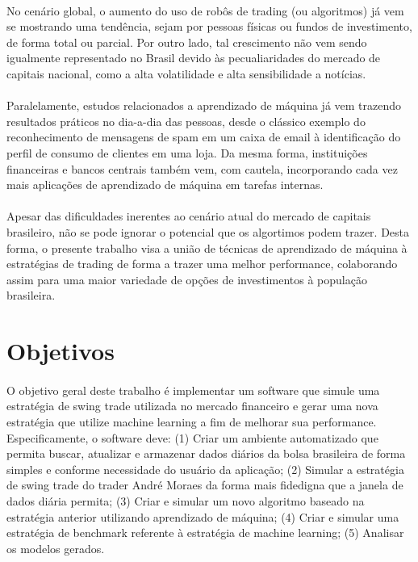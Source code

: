 \paragraph{} No cenário global, o aumento do uso de robôs de trading (ou algoritmos) já vem se mostrando uma tendência\cite{robos_investidores}, sejam por pessoas físicas ou fundos de investimento, de forma total ou parcial. Por outro lado, tal crescimento não vem sendo igualmente representado no Brasil devido às pecualiaridades do mercado de capitais nacional, como a alta volatilidade e alta sensibilidade a notícias\cite{robos_e_fundos}.

\paragraph{} Paralelamente, estudos relacionados a aprendizado de máquina já vem trazendo resultados práticos no dia-a-dia das pessoas, desde o clássico exemplo do reconhecimento de mensagens de spam em um caixa de email à identificação do perfil de consumo de clientes em uma loja. Da mesma forma, instituições financeiras e bancos centrais também vem, com cautela, incorporando cada vez mais aplicações de aprendizado de máquina em tarefas internas\cite{ml_finantial_usage}.

\paragraph{} Apesar das dificuldades inerentes ao cenário atual do mercado de capitais brasileiro, não se pode ignorar o potencial que os algortimos podem trazer. Desta forma, o presente trabalho visa a união de técnicas de aprendizado de máquina à estratégias de trading de forma a trazer uma melhor performance, colaborando assim para uma maior variedade de opções de investimentos à população brasileira.

\section{Objetivos}

\paragraph{} O objetivo geral deste trabalho é implementar um software que simule uma estratégia de swing trade utilizada no mercado financeiro e gerar uma nova estratégia que utilize machine learning a fim de melhorar sua performance. Especificamente, o software deve: (1) Criar um ambiente automatizado que permita buscar, atualizar e armazenar dados diários da bolsa brasileira de forma simples e conforme necessidade do usuário da aplicação; (2) Simular a estratégia de swing trade do trader André Moraes da forma mais fidedigna que a janela de dados diária permita; (3) Criar e simular um novo algoritmo baseado na estratégia anterior utilizando aprendizado de máquina; (4) Criar e simular uma estratégia de benchmark referente à estratégia de machine learning; (5) Analisar os modelos gerados.

